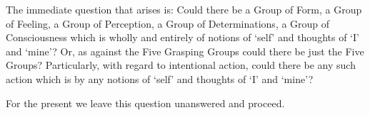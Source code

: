 The immediate question that arises is: Could there be a Group of Form, a Group of Feeling, a Group of Perception, a Group of Determinations, a Group of Consciousness which is wholly and entirely  of notions of `self' and thoughts of `I' and `mine'? Or, as against the Five Grasping Groups could there be just the Five Groups? Particularly, with regard to intentional action, could there be any such action which is  by any notions of `self' and thoughts of `I' and `mine'?

For the present we leave this question unanswered and proceed.
